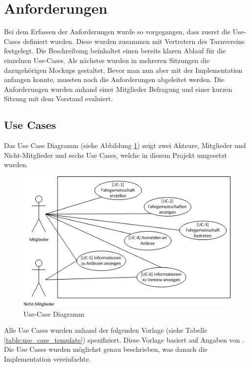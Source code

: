 \newpage
\section{Anforderungen}\label{sec.anfoderungen}
Bei dem Erfassen der Anforderungen wurde so vorgegangen, dass zuerst die Use-Cases definiert wurden. Diese wurden zusammen mit Vertretern des Turnvereins festgelegt. Die Beschreibung beinhaltet einen bereits klaren Ablauf für die einzelnen Use-Cases. Als nächstes wurden in mehreren Sitzungen die dazugehörigen Mockups gestaltet. Bevor man nun aber mit der Implementation anfangen konnte, mussten noch die Anforderungen abgeleitet werden. Die Anforderungen wurden anhand einer Mitglieder Befragung und einer kurzen Sitzung mit dem Vorstand evaluiert.

\subsection{Use Cases}\label{use_cases}
Das Use Case Diagramm (siehe Abbildung \ref{fig:use_case}) zeigt zwei Akteure, Mitglieder und Nicht-Mitglieder und sechs Use Cases, welche in diesem Projekt umgesetzt wurden.
\begin{figure}[h]
\includegraphics{images/anforderungen/use_cases.png}
\caption{Use-Case Diagramm}
\label{fig:use_case}
\end{figure}

Alle Use Cases wurden anhand der folgenden Vorlage (siehe Tabelle \ref{table:use_case_template}) spezifiziert. Diese Vorlage basiert auf Angaben von \cite{req_eng_book}. Die Use Cases wurden möglichst genau beschrieben, was danach die Implementation vereinfachte.

